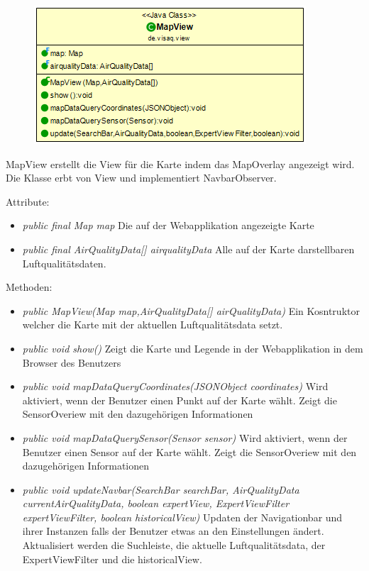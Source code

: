 \begin{minipage}{0.4\textwidth}
    \begin{figure}[H]
        \includegraphics[scale = 0.5]{media/frontend/view/de.view/MapView_Class.png}
    \end{figure}
    \end{minipage} \hfill
    \begin{minipage}{0.4\textwidth}
MapView erstellt die View für die Karte indem das MapOverlay angezeigt wird. Die Klasse erbt von View und implementiert NavbarObserver.
\end{minipage}

Attribute:
\begin{itemize} 
    \item \emph{public final Map map} Die auf der Webapplikation angezeigte Karte
    \item \emph{public final AirQualityData[] airqualityData} Alle auf der Karte darstellbaren Luftqualitätsdaten. 
\end{itemize} 
Methoden:
\begin{itemize} 
    \item \emph{public MapView(Map map,AirQualityData[] airQualityData)} Ein Kosntruktor welcher die Karte mit der aktuellen Luftqualitätsdata setzt.
    \item \emph{public void show()} Zeigt die Karte und Legende in der Webapplikation in dem Browser des Benutzers
    \item \emph{public void mapDataQueryCoordinates(JSONObject coordinates)} Wird aktiviert, wenn der Benutzer einen Punkt auf der Karte wählt. Zeigt die SensorOveriew mit den dazugehörigen Informationen
    \item \emph{public void mapDataQuerySensor(Sensor sensor)} Wird aktiviert, wenn der Benutzer einen Sensor auf der Karte wählt. Zeigt die SensorOveriew mit den dazugehörigen Informationen
    \item \emph{public void updateNavbar(SearchBar searchBar, AirQualityData currentAirQualityData,
    boolean expertView, ExpertViewFilter expertViewFilter, boolean historicalView)} Updaten der Navigationbar und ihrer Instanzen falls der Benutzer etwas an den Einstellungen ändert. Aktualisiert werden die Suchleiste, die aktuelle Luftqualitätsdata, der ExpertViewFilter und die historicalView.
\end{itemize} 

